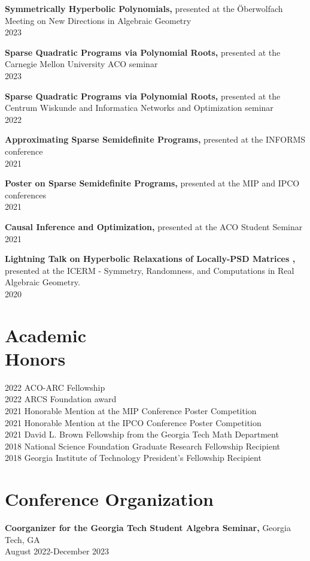 \documentclass[margin]{res}
\begin{document}
\begin{resume}
{\bf  Symmetrically Hyperbolic Polynomials,} presented at the \"Oberwolfach Meeting on New Directions in Algebraic Geometry \\ 2023 

{\bf  Sparse Quadratic Programs via Polynomial Roots,} presented at the Carnegie Mellon University ACO seminar \\ 2023 

{\bf  Sparse Quadratic Programs via Polynomial Roots,} presented at the Centrum Wiskunde and Informatica Networks and Optimization seminar \\ 2022 

{\bf  Approximating Sparse Semidefinite Programs,} presented at the INFORMS conference \\ 2021 

{\bf  Poster on Sparse Semidefinite Programs,} presented at the MIP and IPCO conferences \\ 2021 

{\bf  Causal Inference and Optimization,} presented at the ACO Student Seminar \\ 2021

{\bf  Lightning Talk on Hyperbolic Relaxations of Locally-PSD Matrices ,} presented at the ICERM - Symmetry, Randomness, and Computations in Real Algebraic Geometry.
 \\ 2020



\section{Academic \\ Honors} 
2022 ACO-ARC Fellowship\\
2022 ARCS Foundation award\\
2021 Honorable Mention at the MIP Conference Poster Competition\\
2021 Honorable Mention at the IPCO Conference Poster Competition\\
2021 David L. Brown Fellowship from the Georgia Tech Math Department\\
2018 National Science Foundation Graduate Research Fellowship Recipient\\
2018 Georgia Institute of Technology President's Fellowship Recipient

\section{Conference Organization}
{\bf Coorganizer for the Georgia Tech Student Algebra Seminar,} Georgia Tech, GA    \\       August 2022-December 2023


\end{resume}
\end{document}

